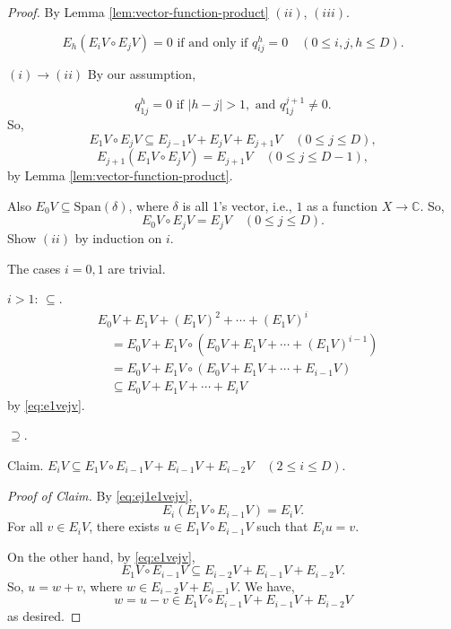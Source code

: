 \documentclass[
]{book}
\theoremstyle{definition}
\theoremstyle{definition}
\theoremstyle{definition}
\theoremstyle{definition}
\theoremstyle{remark}
\begin{document}
\begin{proof}
\leavevmode

By Lemma \ref{lem:vector-function-product} \((ii)\), \((iii)\).

\[E_h(E_iV\circ E_jV) = 0 \text{ if and only if } q^h_{ij} = 0 \quad (0\leq i,j,h\leq D).\]

\((i)\to(ii)\) By our assumption,

\[q^h_{1j} = 0 \text{ if } |h-j|>1, \text{ and } q^{j+1}_{1j}\neq 0.\]
So,
\begin{equation}
E_1V\circ E_jV \subseteq E_{j-1}V + E_jV + E_{j+1}V \quad (0\leq j\leq D), \label{eq:e1vejv}
\end{equation}
\begin{equation}
E_{j+1}(E_1V\circ E_jV) = E_{j+1}V \quad (0\leq j\leq D-1), \label{eq:ej1e1vejv}
\end{equation}
by Lemma \ref{lem:vector-function-product}.

Also \(E_0V \subseteq \mathrm{Span}(\delta)\), where \(\delta\) is all 1's vector, i.e., \(1\) as a function \(X\to \mathbb{C}\).
So,
\begin{equation}
E_0V\circ E_jV = E_jV \quad (0\leq j\leq D). \label{eq:e0vejv}
\end{equation}
Show \((ii)\) by induction on \(i\).

The cases \(i=0, 1\) are trivial.

\(i>1\): \(\subseteq\).
\begin{align}
& E_0V + E_1V + (E_1V)^2 + \cdots + (E_1V)^i\\
& \quad = E_0V + E_1V\circ (E_0V + E_1V + \cdots + (E_1V)^{i-1})\\
& \quad = E_0V + E_1V\circ (E_0V + E_1V + \cdots + E_{i-1}V)\\
& \quad \subseteq E_0V  + E_1V + \cdots + E_{i}V
\end{align}
by \eqref{eq:e1vejv}.

\(\supseteq\).

Claim. \(E_iV\subseteq E_1V\circ E_{i-1}V + E_{i-1}V + E_{i-2}V \quad (2\leq i\leq D)\).

\emph{Proof of Claim.} By \eqref{eq:ej1e1vejv},
\[E_i(E_1V \circ E_{i-1}V) = E_iV.\]
For all \(v\in E_i V\), there exists \(u\in E_1V\circ E_{i-1}V\) such that \(E_iu = v\).

On the other hand, by \eqref{eq:e1vejv},
\[E_1V\circ E_{i-1}V \subseteq E_{i-2}V + E_{i-1}V + E_{i-2}V.\]
So, \(u = w+v\), where \(w\in E_{i-2}V + E_{i-1}V\). We have,
\[w = u-v \in E_1V \circ E_{i-1}V + E_{i-1}V + E_{i-2}V\]
as desired.


\end{proof}
\end{document}
